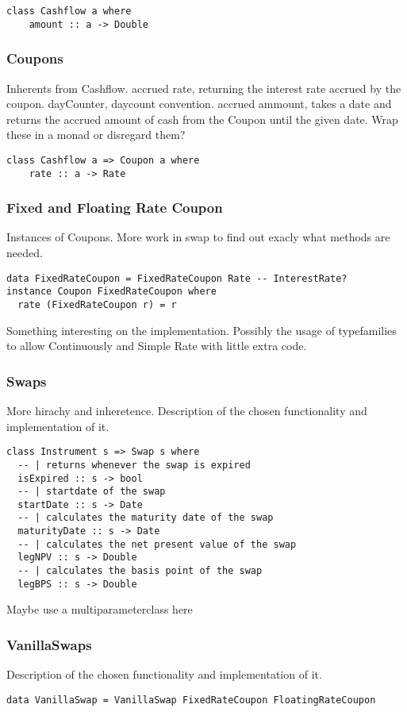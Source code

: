\documentclass{article}
\theoremstyle{definition}
\begin{document}
\begin{verbatim}
class Cashflow a where 
    amount :: a -> Double        
\end{verbatim}

\subsubsection{Coupons}
Inherents from Cashflow.
accrued rate, returning the interest rate accrued by the coupon.
dayCounter, daycount convention.
accrued ammount, takes a date and returns the accrued amount of cash from the Coupon until the given date.
Wrap these in a monad or disregard them?

\begin{verbatim}
class Cashflow a => Coupon a where
    rate :: a -> Rate
\end{verbatim}

\subsubsection{Fixed and Floating Rate Coupon}
Instances of Coupons.
More work in swap to find out exacly what methods are needed.

\begin{verbatim}
data FixedRateCoupon = FixedRateCoupon Rate -- InterestRate?
instance Coupon FixedRateCoupon where
  rate (FixedRateCoupon r) = r 
\end{verbatim}
Something interesting on the implementation. Possibly the usage
of typefamilies to allow Continuously and Simple Rate with little
extra code. 

\subsubsection{Swaps}
More hirachy and inheretence.
Description of the chosen functionality and implementation of it.
\begin{verbatim}
class Instrument s => Swap s where
  -- | returns whenever the swap is expired
  isExpired :: s -> bool
  -- | startdate of the swap
  startDate :: s -> Date 
  -- | calculates the maturity date of the swap
  maturityDate :: s -> Date
  -- | calculates the net present value of the swap 
  legNPV :: s -> Double 
  -- | calculates the basis point of the swap
  legBPS :: s -> Double 
\end{verbatim}
Maybe use a multiparameterclass here

\subsubsection{VanillaSwaps}
Description of the chosen functionality and implementation of it.
\begin{verbatim}
data VanillaSwap = VanillaSwap FixedRateCoupon FloatingRateCoupon
\end{verbatim}
\end{document}
